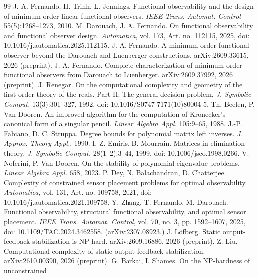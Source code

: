 \documentclass[journal]{IEEEtran}
\theoremstyle{plainn}
\theoremstyle{remark}
\begin{document}
\begin{thebibliography}{99}
 J. A. Fernando, H. Trinh, L. Jennings. Functional observability and the design of minimum order linear functional observers. \emph{IEEE Trans. Automat. Control} 55(5):1268--1273, 2010.
 M. Darouach, J. A. Fernando. On functional observability and functional observer design. \emph{Automatica}, vol. 173, Art. no. 112115, 2025, doi: 10.1016/j.automatica.2025.112115.
 J. A. Fernando. A minimum-order functional observer beyond the Darouach and Luenberger constructions. arXiv:2609.33615, 2026 (preprint).
 J. A. Fernando. Complete characterization of minimum-order functional observers from Darouach to Luenberger. arXiv:2609.37992, 2026 (preprint).
 J. Renegar. On the computational complexity and geometry of the first-order theory of the reals. Part II: The general decision problem. \emph{J. Symbolic Comput.} 13(3):301--327, 1992, doi: 10.1016/S0747-7171(10)80004-5.
 Th. Beelen, P. Van Dooren. An improved algorithm for the computation of Kronecker's canonical form of a singular pencil. \emph{Linear Algebra Appl.} 105:9--65, 1988.
 J.-P. Fabiano, D. C. Struppa. Degree bounds for polynomial matrix left inverses. \emph{J. Approx. Theory Appl.}, 1990.
 I. Z. Emiris, B. Mourrain. Matrices in elimination theory. \emph{J. Symbolic Comput.} 28(1--2):3--44, 1999, doi: 10.1006/jsco.1998.0266.
 V. Noferini, P. Van Dooren. On the stability of polynomial eigenvalue problems. \emph{Linear Algebra Appl.} 658, 2023.
 P. Dey, N. Balachandran, D. Chatterjee. Complexity of
  constrained sensor placement problems for optimal observability.
  \emph{Automatica}, vol. 131, Art. no. 109758, 2021,
  doi: 10.1016/j.automatica.2021.109758.
 Y. Zhang, T. Fernando, M. Darouach. Functional
  observability, structural functional observability, and optimal sensor
  placement. \emph{IEEE Trans. Automat. Control}, vol. 70, no. 3,
  pp. 1592--1607, 2025, doi: 10.1109/TAC.2024.3462558.
  (arXiv:2307.08923.)
 J. L\"{o}fberg. Static output-feedback stabilization is
  NP-hard. arXiv:2609.16886, 2026 (preprint).
 Z. Liu. Computational complexity of static output feedback
  stabilization. arXiv:2610.00390, 2026 (preprint).
 G. Barkai, I. Shames. On the NP-hardness of unconstrained

\end{thebibliography}
\end{document}
